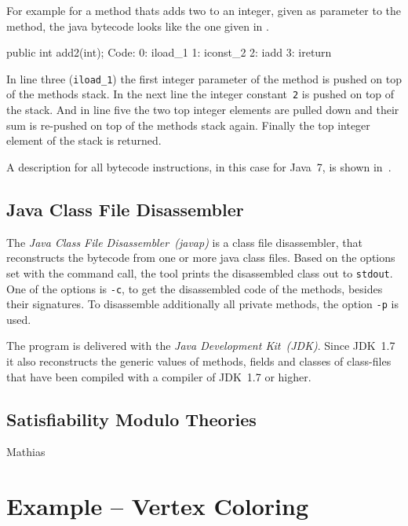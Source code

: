 \documentclass[conference]{IEEEtran}
\begin{document}
For example for a method thats adds two to an integer, given as parameter to
the method, the java bytecode looks like the one given in
.

\begin{javalisting}[caption=Java bytecode list for a Method that adds up 2,
    label=lst:example_bytecode_add_up_2]
public int add2(int);
  Code:
   0: iload_1
   1: iconst_2
   2: iadd
   3: ireturn
\end{javalisting}

In line three (\texttt{iload\_1}) the first integer parameter of the method is
pushed on top of the methods stack. In the next line the integer
constant~\texttt{2} is pushed on top of the stack. And in line five the two top
integer elements are pulled down and their sum is re-pushed on top of the
methods stack again. Finally the top integer element of the stack is returned.

A description for all bytecode instructions, in this case for Java~7, is shown
in~\cite{LindholmYBB11}.

\subsection{Java Class File Disassembler}
\label{sec:prelim_javap}

The \emph{Java Class File Disassembler~(javap)} is a class file disassembler,
that reconstructs the bytecode from one or more java class files. Based on the
options set with the command call, the tool prints the disassembled class out
to \texttt{stdout}. One of the options is \texttt{-c}, to get the disassembled
code of the methods, besides their signatures. To disassemble additionally all
private methods, the option \texttt{-p} is used.

The program is delivered with the \emph{Java Development Kit~(JDK)}. Since
JDK~1.7 it also reconstructs the generic values of methods, fields and classes
of class-files that have been compiled with a compiler of JDK~1.7 or higher.

\subsection{Satisfiability Modulo Theories}
\label{sec:prelim_smt}

\danger Mathias

\section{Example -- Vertex Coloring}
\label{sec:example_vertex_coloring}
\end{document}
